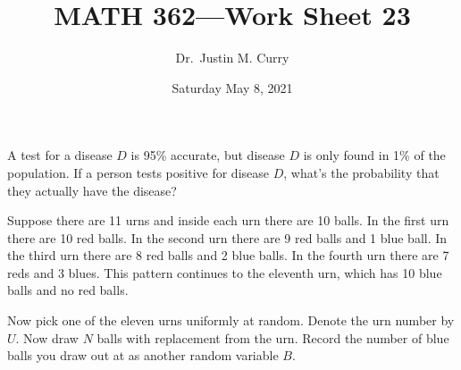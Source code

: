 \documentclass[addpoints,12pt]{exam}
\title{\vspace{-1in} MATH 362---Work Sheet 23}
\date{Saturday May 8, 2021}
\author{Dr.~Justin M. Curry}
\begin{document}
\maketitle





\begin{questions}

\question[1] A test for a disease $D$ is 95\% accurate, but disease $D$ is only found in 1\% of the population. If a person tests positive for disease $D$, what's the probability that they actually have the disease?

\vspace{1.7in}

\question[5] Suppose there are 11 urns and inside each urn there are 10 balls. In the first urn there are 10 red balls. In the second urn there are 9 red balls and 1 blue ball. In the third urn there are 8 red balls and 2 blue balls. In the fourth urn there are 7 reds and 3 blues. This pattern continues to the eleventh urn, which has 10 blue balls and no red balls.

Now pick one of the eleven urns uniformly at random. Denote the urn number by $U$. Now draw $N$ balls with replacement from the urn. Record the number of blue balls you draw out at as another random variable $B$.

\noaddpoints
{}
\end{questions}
\end{document}
